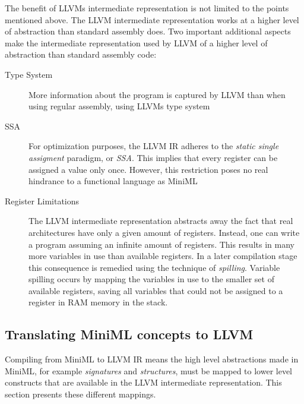 The benefit of LLVMs intermediate representation is not limited to the points mentioned above.
The LLVM intermediate representation works at a higher level of abstraction than standard assembly does.
Two important additional aspects make the intermediate representation used by LLVM of a higher level of abstraction than standard assembly code:

\begin{description}
\item[Type System] More information about the program is captured by LLVM than when using regular assembly, using LLVMs type system
\item[SSA] For optimization purposes, the LLVM IR adheres to the \emph{static single assigment} paradigm, or \emph{SSA}.
This implies that every register can be assigned a value only once. However, this restriction poses no real hindrance to a functional language as \mbox{MiniML}
\item[Register Limitations]  The LLVM intermediate representation abstracts away the fact that real architectures have only a given amount of registers.
Instead, one can write a program assuming an infinite amount of registers.
This results in many more variables in use than available registers.
In a later compilation stage this consequence is remedied using the technique of \emph{spilling}.
Variable spilling occurs by mapping the variables in use to the smaller set of available registers, saving all variables that could not be assigned to a register in RAM memory in the stack.
\end{description}

\subsection{Translating MiniML concepts to LLVM}
Compiling from \mbox{MiniML} to LLVM IR means the high level abstractions made in \mbox{MiniML}, for example \emph{signatures} and \emph{structures}, must be mapped to lower level constructs that are available in the LLVM intermediate representation.
This section presents these different mappings.

